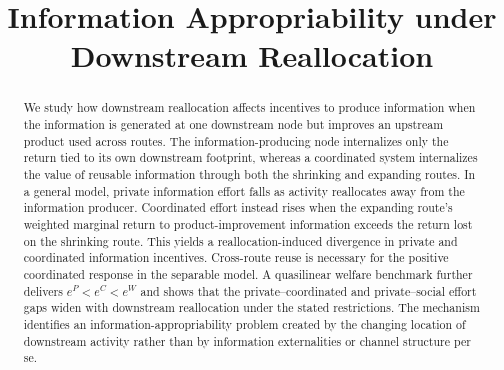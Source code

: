 \documentclass[11pt]{article}
\title{Information Appropriability under Downstream Reallocation}
\author{}
\date{}
\begin{document}
\maketitle

\begin{abstract}
We study how downstream reallocation affects incentives to produce information when the information is generated at one downstream node but improves an upstream product used across routes. The information-producing node internalizes only the return tied to its own downstream footprint, whereas a coordinated system internalizes the value of reusable information through both the shrinking and expanding routes. In a general model, private information effort falls as activity reallocates away from the information producer. Coordinated effort instead rises when the expanding route's weighted marginal return to product-improvement information exceeds the return lost on the shrinking route. This yields a reallocation-induced divergence in private and coordinated information incentives. Cross-route reuse is necessary for the positive coordinated response in the separable model. A quasilinear welfare benchmark further delivers $e^{P}<e^{C}<e^{W}$ and shows that the private--coordinated and private--social effort gaps widen with downstream reallocation under the stated restrictions. The mechanism identifies an information-appropriability problem created by the changing location of downstream activity rather than by information externalities or channel structure per se.
\end{abstract}














\end{document}
